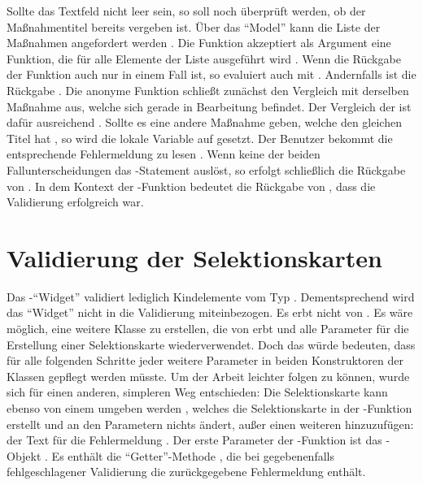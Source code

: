 Sollte das Textfeld nicht leer sein, so soll noch überprüft werden, ob der Maßnahmentitel bereits vergeben ist.
Über das \enquote{Model} kann die Liste der Maßnahmen angefordert werden .
Die Funktion  akzeptiert als Argument eine Funktion, die für alle Elemente der Liste ausgeführt wird .
Wenn die Rückgabe der Funktion auch nur in einem Fall  ist, so evaluiert auch  mit .
Andernfalls ist die Rückgabe . 
Die anonyme Funktion schließt zunächst den Vergleich mit derselben Maßnahme aus, welche sich gerade in Bearbeitung befindet.
Der Vergleich der  ist dafür ausreichend .
Sollte es eine andere Maßnahme geben, welche den gleichen Titel hat , so wird die lokale Variable  auf  gesetzt.
Der Benutzer bekommt die entsprechende Fehlermeldung  zu lesen .
Wenn keine der beiden Fallunterscheidungen das -Statement  auslöst, so erfolgt schließlich die Rückgabe von .
In dem Kontext der -Funktion bedeutet die Rückgabe von  , dass die Validierung erfolgreich war.
 
\section{Validierung der Selektionskarten}
 
Das -\enquote{Widget} validiert lediglich Kindelemente vom Typ .
Dementsprechend wird das \enquote{Widget}  nicht in die Validierung miteinbezogen.
Es erbt nicht von .
Es wäre möglich, eine weitere Klasse zu erstellen, die von  erbt und alle Parameter für die Erstellung einer Selektionskarte wiederverwendet.
Doch das würde bedeuten, dass für alle folgenden Schritte jeder weitere Parameter in beiden Konstruktoren der Klassen gepflegt werden müsste.
Um der Arbeit leichter folgen zu können, wurde sich für einen anderen, simpleren Weg entschieden: 
Die Selektionskarte kann ebenso von einem  umgeben werden ,
welches die Selektionskarte in der -Funktion erstellt und an den Parametern nichts ändert,
außer einen weiteren hinzuzufügen: der Text für die Fehlermeldung .
Der erste Parameter der -Funktion ist das -Objekt .
Es enthält die \enquote{Getter}-Methode , die bei gegebenenfalls fehlgeschlagener Validierung die zurückgegebene Fehlermeldung enthält.

